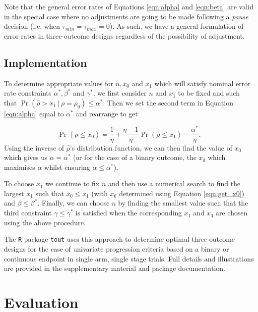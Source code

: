 \documentclass[referee, lineno, pdflatex,sn-vancouver,Numbered]{sn-jnl}%
\theoremstyle{thmstyleone}%
\theoremstyle{thmstyletwo}%
\theoremstyle{thmstylethree}%
\begin{document}
Note that the general error rates of Equations \ref{eqn:alpha} and \ref{eqn:beta} are valid in the special case where no adjustments are going to be made following a \emph{pause} decision (i.e. when $\tau_{min} = \tau_{max} = 0$). As such, we have a general formulation of error rates in three-outcome designs regardless of the possibility of adjustment. 

\subsection{Implementation}

To determine appropriate values for $n, x_0$ and $x_1$ which will satisfy nominal error rate constraints $\alpha^*, \beta^*$ and $\gamma^*$, we first consider $n$ and $x_1$ to be fixed and such that $\Pr(\hat{\rho} > x_1 ~|~ \rho = \rho_0) \leq \alpha^*$. Then we set the second term in Equation \ref{eqn:alpha} equal to $\alpha^*$ and rearrange to get

\begin{equation}\label{eqn:get_x0}
\Pr(\hat{\rho} \leq x_0) = \frac{1}{\eta} + \frac{\eta - 1}{\eta}\Pr(\hat{\rho} \leq x_1) - \frac{\alpha^*}{\eta}.
\end{equation}
Using the inverse of $\hat{\rho}$'s distribution function, we can then find the value of $x_0$ which gives us $\alpha = \alpha^*$ (or for the case of a binary outcome, the $x_0$ which maximises $\alpha$ whilst ensuring $\alpha \leq \alpha^*$).

To choose $x_1$ we continue to fix $n$ and then use a numerical search to find the largest $x_1$ such that $x_0 \leq x_1$ (with $x_0$ determined using Equation \ref{eqn:get_x0}) and $\beta \leq \beta^*$. Finally, we can choose $n$ by finding the smallest value such that the third constraint $\gamma \leq \gamma^*$ is satisfied when the corresponding $x_1$ and $x_0$ are chosen using the above procedure.

The \texttt{R} package \texttt{tout} uses this approach to determine optimal three-outcome designs for the case of univariate progression criteria based on a binary or continuous endpoint in single arm, single stage trials. Full details and illustrations are provided in the supplementary material and package documentation.

\section{Evaluation}\label{sec:evaluation}
\end{document}
